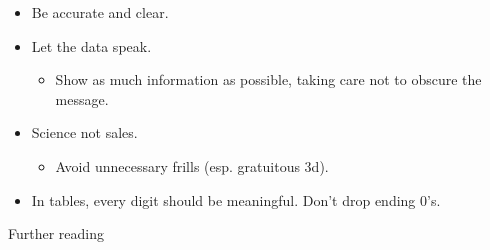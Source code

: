 \documentclass[12pt]{article}
\newcommand{\headsize}{\fontsize{35}{35} \selectfont}
\newcommand{\smallersize}{\fontsize{20}{25} \selectfont}
\newcommand{\smallestsize}{\fontsize{18}{22} \selectfont}
\begin{document}
\hspace{0.5in} \begin{minipage}[t]{9in}
\begin{itemize}

\itemsep24pt

\item Be accurate and clear.

\item Let the data speak.

{\color{myblue} \smallersize
\begin{itemize}
\item Show as much information as possible, taking care not to
  obscure the message.
\end{itemize} }

\item Science not sales.

{\color{myblue} \smallersize
\begin{itemize}
\item Avoid unnecessary frills (esp. gratuitous 3d).
\end{itemize} }

\item In tables, every digit should be meaningful. Don't drop ending 0's.

\end{itemize}
\end{minipage}


\newpage


\headsize \color{myyellow}
\hfill \begin{minipage}{5.75in}
\centering
Further reading
\end{minipage}

\vspace{30mm}
\smallestsize \color{mywhite}
\end{document}
